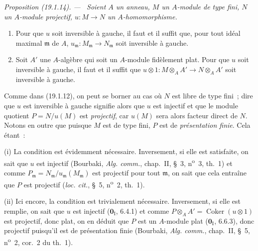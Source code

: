 \documentclass[10pt,oneside]{book}
\makeatletter
\newcommand{\setmanualcurrentlabel}[1]{\def\@currentlabel{#1}}
\newcommand{\oldpage}[2][]{%
  \setcounter{footnote}{0}%
  \marginpar{\scriptsize\textbf{#1}~|~#2}\ignorespaces}
\newenvironment{proposition}[1][]{%
  \setmanualcurrentlabel{#1}\par\medskip\noindent\itshape Proposition (#1). ---\ }{\par}
\makeatother
\begin{document}
\begin{proposition}[19.1.14]
\label{0.19.1.14-fr}
Soient $A$ un anneau, $M$ un $A$-module de type fini, $N$ un $A$-module
projectif, $u:M\to N$ un $A$-homomorphisme.
\begin{enumerate}
  \item[(i)] Pour que $u$ soit inversible à gauche, il faut et il suffit que,
  pour tout idéal maximal $\mathfrak m$ de $A$,
  $u_{\mathfrak m}:M_{\mathfrak m}\to N_{\mathfrak m}$ soit inversible à
  gauche.
  \item[(ii)] Soit $A'$ une $A$-algèbre qui soit un $A$-module fidèlement
  plat. Pour que $u$ soit inversible à gauche, il faut et il suffit que
  $u\otimes1:M\otimes_AA'\to N\otimes_AA'$ soit inversible à gauche.
\end{enumerate}
\end{proposition}

Comme dans (19.1.12), on peut se borner au cas où $N$ est libre de type fini~;
dire que $u$ est inversible à gauche signifie alors que $u$ est injectif et
que le module quotient $P=N/u(M)$ est \emph{projectif}, car $u(M)$ sera alors
facteur direct de $N$. Notons en outre que puisque $M$ est de type fini, $P$
est de \emph{présentation finie}. Cela étant~:

(i) La condition est évidemment nécessaire. Inversement, si elle est
satisfaite, on sait que $u$ est injectif (Bourbaki, \emph{Alg. comm.},
chap.~II, §~3, n\textsuperscript{o}~3, th.~1) et comme
$P_{\mathfrak m}=N_{\mathfrak m}/u_{\mathfrak m}(M_{\mathfrak m})$ est
projectif pour tout $\mathfrak m$, on sait que cela entraîne que $P$ est
projectif (\emph{loc. cit.}, §~5, n\textsuperscript{o}~2, th.~1).

(ii) Ici encore, la condition est trivialement nécessaire. Inversement, si
elle est remplie, on sait que $u$ est injectif ($\mathbf{0}_{\mathrm I}$,
6.4.1) et comme $P\otimes_AA'=\operatorname{Coker}(u\otimes1)$ est projectif,
donc plat, on en déduit que $P$ est un $A$-module plat
($\mathbf{0}_{\mathrm I}$, 6.6.3), donc projectif puisqu'il est de présentation
finie (Bourbaki, \emph{Alg. comm.}, chap.~II, §~5,
n\textsuperscript{o}~2, cor.~2 du th.~1).

\oldpage[0\textsubscript{IV-1}]{78}
\end{document}
